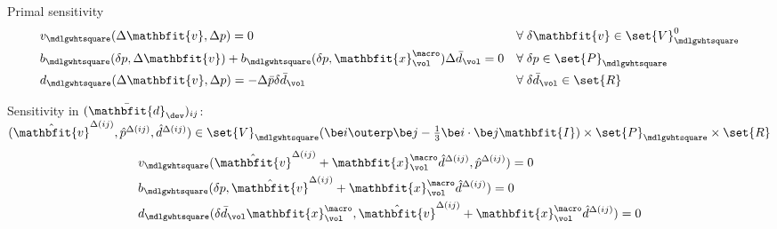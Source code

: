 \documentclass[a4paper,11pt]{article}
\renewcommand{\ta}[1]{\mathbfit{#1}}
\renewcommand{\ts}[1]{\mathbfit{#1}}
\renewcommand{\Box}{\mdlgwhtsquare}
\begin{document}
Primal sensitivity
\begin{align}
 &v_\Box(\Delta\ta v,\Delta p) = 0 && \forall\; \delta\ta v\in \set{V}_\Box^0\\
 &b_\Box(\delta p,\Delta\ta v) + b_\Box(\delta p,\ta x^\macro_\vol) \Delta\bar{d}_\vol = 0 && \forall\; \delta p \in \set{P}_\Box\\
 &d_\Box(\Delta\ta v,\Delta p) = -\Delta\bar{p} \delta\bar{d}_\vol && \forall\;\delta\bar{d}_\vol \in \set{R}
\end{align}

Sensitivity in $(\bar{\ts d}_\dev)_{ij}$: $(\hat{\ta v}^{\Delta(ij)}, \hat{p}^{\Delta(ij)}, \hat{d}^{\Delta(ij)}) \in \set{V}_\Box(\be i\outerp\be j - \frac13\be i\cdot\be j\ts I)\times \set{P}_\Box \times\set{R}$
\begin{align}
 &v_\Box(\hat{\ta v}^{\Delta(ij)}+\ta x^\macro_\vol \hat{d}^{\Delta(ij)}, \hat{p}^{\Delta(ij)}) = 0
 \\
 &b_\Box(\delta p,\hat{\ta v}^{\Delta(ij)} + \ta x^\macro_\vol \hat{d}^{\Delta(ij)}) = 0
 \\
 &d_\Box(\delta\bar{d}_\vol\ta x^\macro_\vol,\hat{\ta v}^{\Delta(ij)}+\ta x^\macro_\vol \hat{d}^{\Delta(ij)}) = 0
\end{align}
\end{document}
